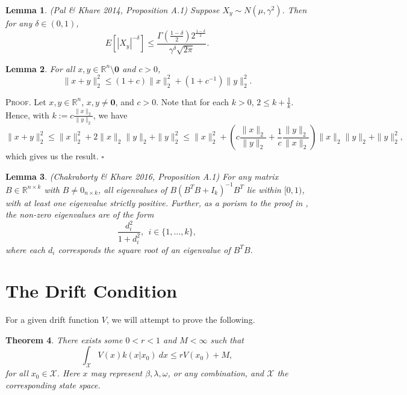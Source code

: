 \documentclass[12pt]{article}
\newtheorem{theorem}{Theorem}
\newtheorem{lemma}[theorem]{Lemma}
\newcounter{ProofCounter}
\newenvironment{Proof}{\stepcounter{ProofCounter}\textsc{Proof.}}{\hfill$\square$}
\begin{document}
\begin{lemma}
  (Pal \& Khare 2014, Proposition A.1)
  Suppose $X_{y} \sim N(\mu, \gamma^2)$. Then for any $\delta \in (0,1)$, 
  \[
    E\left[ |X_{y}|^{-\delta} \right] \leq \frac{\Gamma\left( \frac{1-\delta}{2} \right) 2^{\frac{1-\delta}{2}}}{\gamma^\delta \sqrt{2\pi}}.
  \]
  \label{l6}
\end{lemma}

\begin{lemma}
  For all $x,y \in \mathbb{R}^n \setminus \bm{0}$ and $c > 0$, 
  \[
    \|x + y\|_2^2 \leq (1 + c) \|x\|_2^2 + (1 + c^{-1})\|y\|_2^2.
  \]
  \label{l7}
\end{lemma}
\begin{Proof}
  Let $x, y \in \mathbb{R}^n$, $x, y \neq \bm{0}$, and $c > 0$. Note that for each $k > 0$, $2 \leq k + \frac{1}{k}$. Hence, with $k := c \frac{\|x\|_2}{\|y\|_2}$, we have
  \[
    \|x + y\|_2^2 \leq \|x\|_2^2 + 2\|x\|_2 \|y\|_2 + \|y\|_2^2 \leq \|x\|_2^2 + \left( c\frac{\|x\|_2}{\|y\|_2} + \frac{1}{c}\frac{\|y\|_2}{\|x\|_2}
    \right)\|x\|_2 \|y\|_2 + \|y\|_2^2,
  \]
  which gives us the result.
\end{Proof} \\

\begin{lemma}
  (Chakraborty \& Khare 2016, Proposition A.1)
  For any matrix $B \in \mathbb{R}^{n\times k}$ with $B \neq 0_{n\times k}$, all eigenvalues of $B(B^T B + I_{k})^{-1}B^T$ lie within $[0,1)$, with at
  least one eigenvalue strictly positive. Further, as a porism to the proof in \cite{probit}, the non-zero eigenvalues are of the form 
  \[
    \frac{d_i^2}{1 + d_i^2}, \ \ i \in\{ 1, \dots, k\},
  \]
  where each $d_i$ corresponds the square root of an eigenvalue of $B^T B$.
  \label{l8}
\end{lemma}



\newpage

\section{The Drift Condition}

For a given drift function $V$, we will attempt to prove the following. \\

\begin{theorem}
  There exists some $0 < r < 1$ and $M < \infty$ such that 
  \[
    \int_{\mathcal{X}} V(x)k(x|x_0)\ dx \leq r V(x_0) + M,
  \]
  for all $x_0 \in \mathcal{X}$. Here $x$ may represent $\beta, \lambda, \omega$, or any combination, and $\mathcal{X}$ the corresponding state space.
  \label{thm1}
\end{theorem}
\end{document}
